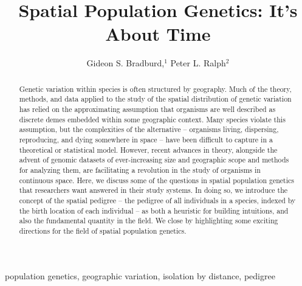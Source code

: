 \documentclass{ar-1col}
\newcommand{\todo}[1]{{\textbf{\color{red}{#1}}}}
\begin{document}

\title{Spatial Population Genetics: It's About Time \todo{we don't really deliver on this title}}


\author{Gideon S. Bradburd,$^1$ Peter L. Ralph$^2$
}

\begin{abstract}

Genetic variation within species is often structured by geography.
Much of the theory, methods, and data applied to the study 
of the spatial distribution of genetic variation 
has relied on the approximating assumption that 
organisms are well described as discrete demes  
embedded within some geographic context.
Many species violate this assumption, 
but the complexities of the alternative -- 
organisms living, dispersing, reproducing, and dying 
somewhere in space -- 
have been difficult to capture in a theoretical or statistical model.
However, recent advances in theory, 
alongside the advent of genomic datasets 
of ever-increasing size and geographic scope 
and methods for analyzing them,
are facilitating a revolution in the study of organisms in continuous space.
Here, we discuss some of the questions in spatial population genetics 
that researchers want answered in their study systems.
In doing so, we introduce the concept of the spatial pedigree -- 
the pedigree of all individuals in a species, 
indexed by the birth location of each individual
--
as both a heuristic for building intuitions, 
and also the fundamental quantity in the field.
We close by highlighting some exciting directions 
for the field of spatial population genetics.
\end{abstract}

\begin{keywords}
population genetics, geographic variation, isolation by distance, pedigree
\end{keywords}
\maketitle
\end{document}
